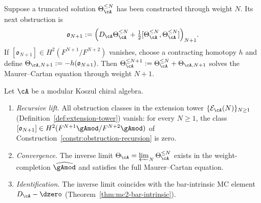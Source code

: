 \begin{construction}
\label{constr:obstruction-recursion}
Suppose a truncated solution $\Theta_{\cA}^{\leq N}$ has been
constructed through weight $N$.  Its next obstruction is
\begin{equation}
\label{eq:next-obstruction}
\mathfrak{o}_{N+1}
:=
\Bigl(
D_{\cA}\Theta_{\cA}^{\leq N}
+ \tfrac12[\Theta_{\cA}^{\leq N},
\Theta_{\cA}^{\leq N}]
\Bigr)_{N+1}.
\end{equation}
If $[\mathfrak{o}_{N+1}] \in H^2(F^{N+1}/F^{N+2})$ vanishes,
choose a contracting homotopy $h$ and define
$\Theta_{\cA,N+1} := -h(\mathfrak{o}_{N+1})$.
Then $\Theta_{\cA}^{\leq N+1} := \Theta_{\cA}^{\leq N}
+ \Theta_{\cA,N+1}$ solves the Maurer--Cartan equation through
weight $N+1$.
\end{construction}

\begin{theorem}
\label{thm:recursive-existence}
Let $\cA$ be a modular Koszul chiral algebra.
\begin{enumerate}[label=\textup{(\roman*)}]
\item \emph{Recursive lift.}
  All obstruction classes in the extension tower
  $\{\mathcal{E}_{\cA}(N)\}_{N \geq 1}$
  \textup{(}Definition~\textup{\ref{def:extension-tower})}
  vanish: for every $N \geq 1$, the class
  $[\mathfrak{o}_{N+1}] \in
  H^2(F^{N+1}\gAmod / F^{N+2}\gAmod)$ of
  Construction~\textup{\ref{constr:obstruction-recursion}}
  is zero.
\item \emph{Convergence.}
  The inverse limit
  $\Theta_\cA = \varprojlim_N \Theta_\cA^{\leq N}$
  exists in the weight-completion $\widehat{\gAmod}$ and
  satisfies the full Maurer--Cartan equation.
\item \emph{Identification.}
  The inverse limit coincides with the bar-intrinsic MC
  element $D_\cA - \dzero$
  \textup{(}Theorem~\textup{\ref{thm:mc2-bar-intrinsic})}.
\end{enumerate}
\end{theorem}

